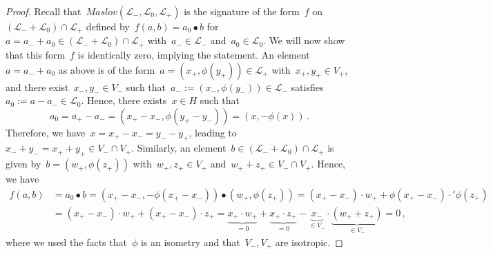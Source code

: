 \documentclass[10pt,a4paper]{amsart}
\begin{document}
\begin{proof}
		Recall that~$\mathit{Maslov}(\mathcal{L}_-,\mathcal{L}_0,\mathcal{L}_+)$ is the signature of the
		form~$f$ on~$(\mathcal{L}_-+\mathcal{L}_0)\cap\mathcal{L}_+$ defined by~$f(a,b)=a_0\bullet b$ for~$a=a_-+a_0\in(\mathcal{L}_-+\mathcal{L}_0)\cap\mathcal{L}_+$ with~$a_-\in\mathcal{L}_-$ and~$a_0\in\mathcal{L}_0$.
		We will now show that this form~$f$ is identically zero, implying the statement. An element~$a=a_-+a_0$ as above is of the form~$a=(x_+,\phi(y_+))\in\mathcal{L}_+$ with~$x_+,y_+\in V_+$, and there exist~$x_-,y_-\in V_-$ such that~$a_-:=(x_-,\phi(y_-))\in\mathcal{L}_-$ satisfies~$a_0:=a-a_-\in\mathcal{L}_0$. Hence, there exists~$x\in H$ such that
		\[
		a_0=a_+-a_-=(x_+-x_-,\phi(y_+-y_-))=(x,-\phi(x))\,.
		\]
		Therefore, we have~$x=x_+-x_-=y_--y_+$, leading to~$x_-+y_-=x_++y_+\in V_-\cap V_+$.
		Similarly, an element~$b\in(\mathcal{L}_-+\mathcal{L}_0)\cap\mathcal{L}_+$ is given by~$b=(w_+,\phi(z_+))$ with~$w_+,z_+\in V_+$ and~$w_++z_+\in V_-\cap V_+$. Hence, we have
		\begin{align*}
			f(a,b)&=a_0\bullet b=(x_+-x_-,-\phi(x_+-x_-))\bullet (w_+,\phi(z_+))=(x_+-x_-)\cdot w_++\phi(x_+-x_-)\cdot'\phi(z_+)\\
			&=(x_+-x_-)\cdot w_++(x_+-x_-)\cdot z_+=\underbrace{x_+\cdot w_+}_{=0}+\underbrace{x_+\cdot z_+}_{=0}-\underbrace{x_-}_{\in V_-}\cdot \underbrace{(w_++z_+)}_{\in V_-}=0\,,
		\end{align*}
		where we used the facts that~$\phi$ is an isometry and that~$V_-,V_+$ are isotropic.
	\end{proof}	
\end{document}
